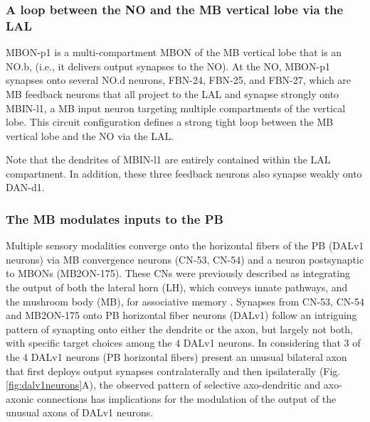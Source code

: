     \subsubsection{A loop between the NO and the MB vertical lobe via the LAL}

    MBON-p1 is a multi-compartment MBON of the MB vertical lobe that is an NO.b, (i.e., it delivers output synapses to the NO).
    At the NO, MBON-p1 synapses onto several NO.d neurons, FBN-24, FBN-25, and FBN-27, which are MB feedback neurons \citep{eschbach2020recurrent} that all project to the LAL and synapse strongly onto MBIN-l1, a MB input neuron targeting multiple compartments of the vertical lobe.
    This circuit configuration defines a strong tight loop between the MB vertical lobe and the NO via the LAL.

    Note that the dendrites of MBIN-l1 are entirely contained within the LAL compartment.
    In addition, these three feedback neurons also synapse weakly onto DAN-d1.


    \subsubsection{The MB modulates inputs to the PB}

    Multiple sensory modalities converge onto the horizontal fibers of the PB (DALv1 neurons) via MB convergence neurons (CN-53, CN-54) and a neuron postsynaptic to MBONs (MB2ON-175).
    These CNs were previously described as integrating the output of both the lateral horn (LH), which conveys innate pathways, and the mushroom body (MB), for associative memory \citep{eschbach2021circuits}.
    Synapses from CN-53, CN-54 and MB2ON-175 onto PB horizontal fiber neurons (DALv1) follow an intriguing pattern of synapting onto either the dendrite or the axon, but largely not both, with specific target choices among the 4 DALv1 neurons.
    In considering that 3 of the 4 DALv1 neurons (PB horizontal fibers) present an unusual bilateral axon that first deploys output synapses contralaterally and then ipsilaterally (Fig. \ref{fig:dalv1neurons}A), the observed pattern of selective axo-dendritic and axo-axonic connections has implications for the modulation of the output of the unusual axons of DALv1 neurons.


